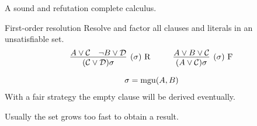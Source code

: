 
	\begin{goal}
		A sound and refutation complete calculus.
	\end{goal}
	
	\begin{block}{First-order resolution}
		Resolve and factor all clauses and literals in an unsatisfiable set. 
		\begin{gather*}
			\infer
			[(\sigma)\text{ R}]
			{(\mcC \lor \mcD)\sigma}
			{{A} \lor\mcC & {\lnot B} \lor\mcD}
			\hspace{1cm}
			\infer
			[(\sigma)\text{ F}]
			{(A \lor \mcC)\sigma}
			{{A}\lor B\lor\mcC} \\[0.7em]
			\sigma = \mgu(A,B)
		\end{gather*}
		With a fair strategy the empty clause will be derived eventually.
	\end{block}
	
	\begin{observation}
		Usually the set grows too fast to obtain a result.
	\end{observation}